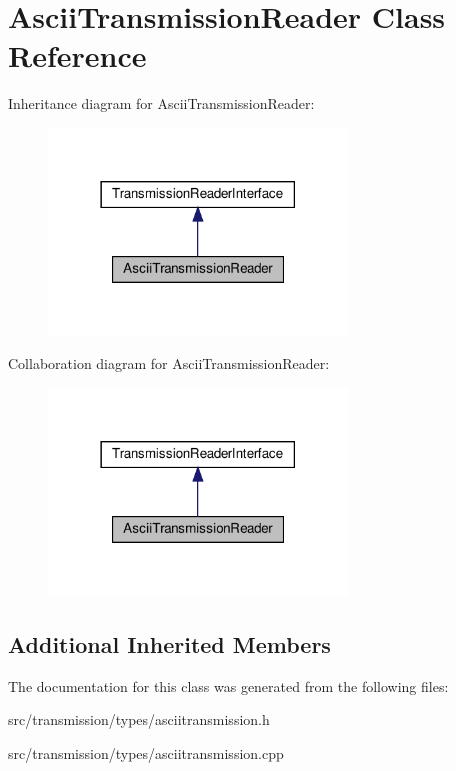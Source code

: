 \hypertarget{classAsciiTransmissionReader}{}\section{Ascii\+Transmission\+Reader Class Reference}
\label{classAsciiTransmissionReader}


Inheritance diagram for Ascii\+Transmission\+Reader\+:
\nopagebreak
\begin{figure}[H]
\begin{center}
\leavevmode
\includegraphics[width=225pt]{classAsciiTransmissionReader__inherit__graph}
\end{center}
\end{figure}


Collaboration diagram for Ascii\+Transmission\+Reader\+:
\nopagebreak
\begin{figure}[H]
\begin{center}
\leavevmode
\includegraphics[width=225pt]{classAsciiTransmissionReader__coll__graph}
\end{center}
\end{figure}
\subsection*{Additional Inherited Members}


The documentation for this class was generated from the following files\+:\begin{DoxyCompactItemize}
\item 
src/transmission/types/asciitransmission.\+h\item 
src/transmission/types/asciitransmission.\+cpp\end{DoxyCompactItemize}
